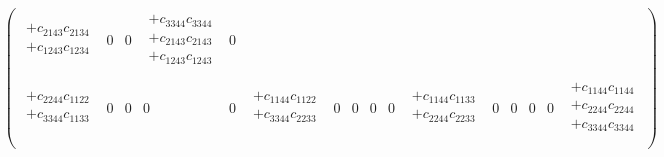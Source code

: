 \begin{eqnarray}
\begin{pmatrix}
\begin{array}{l}
+c_{2143}c_{2134} \\
+c_{1243}c_{1234} \\
\end{array} &
0 &
0 &
\begin{array}{l}
+c_{3344}c_{3344} \\
+c_{2143}c_{2143} \\
+c_{1243}c_{1243} \\
\end{array} &
0 \\
\begin{array}{l}
+c_{2244}c_{1122} \\
+c_{3344}c_{1133} \\
\end{array} &
0 &
0 &
0 &
0 &
\begin{array}{l}
+c_{1144}c_{1122} \\
+c_{3344}c_{2233} \\
\end{array} &
0 &
0 &
0 &
0 &
\begin{array}{l}
+c_{1144}c_{1133} \\
+c_{2244}c_{2233} \\
\end{array} &
0 &
0 &
0 &
0 &
\begin{array}{l}
+c_{1144}c_{1144} \\
+c_{2244}c_{2244} \\
+c_{3344}c_{3344} \\
\end{array} \\
\end{pmatrix}
\end{eqnarray}

